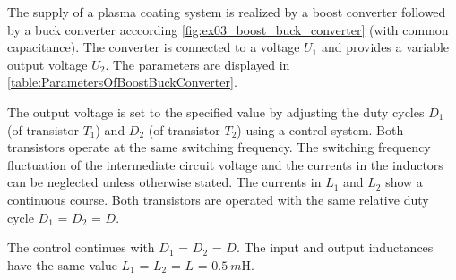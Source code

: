 
The supply of a plasma coating system is realized by a boost converter followed by a buck converter acccording \autoref{fig:ex03_boost_buck_converter} (with common capacitance).
The converter is connected to a voltage $U_\mathrm{1}$ and provides a variable output voltage $U_\mathrm{2}$. The parameters are displayed in \autoref{table:ParametersOfBoostBuckConverter}.
\vspace{2em}\par

\par

\par


The output voltage is set to the specified value by adjusting the duty cycles $D_\mathrm{1}$ (of transistor $T_\mathrm{1}$) 
and $D_\mathrm{2}$ (of transistor $T_\mathrm{2}$) using a control system. Both transistors operate at the same switching frequency. 
The switching frequency fluctuation of the intermediate circuit voltage and the currents in the inductors can be neglected unless otherwise stated. 
The currents in $L_\mathrm{1}$ and $L_\mathrm{2}$ show a continuous course. Both transistors are operated with the 
same relative duty cycle $D_\mathrm{1}$ = $D_\mathrm{2}$ = $D$.




\vspace{2em}\par
The control continues with $D_\mathrm{1}$ = $D_\mathrm{2}$ = $D$. The input and output inductances 
have the same value $L_\mathrm{1}$ = $L_\mathrm{2}$ = $L$ = $\SI{0.5}{m\henry}$.


